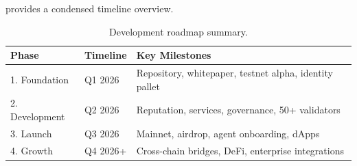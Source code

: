  provides a condensed timeline overview.

\begin{table}[ht]
\centering
\caption{Development roadmap summary.}
\label{tab:roadmap}
\begin{tabular}{@{}llp{7cm}@{}}
\toprule
\textbf{Phase} & \textbf{Timeline} & \textbf{Key Milestones} \\
\midrule
1. Foundation & Q1 2026 & Repository, whitepaper, testnet alpha, identity pallet \\
2. Development & Q2 2026 & Reputation, services, governance, 50+ validators \\
3. Launch & Q3 2026 & Mainnet, airdrop, agent onboarding, dApps \\
4. Growth & Q4 2026+ & Cross-chain bridges, DeFi, enterprise integrations \\
\bottomrule
\end{tabular}
\end{table}
